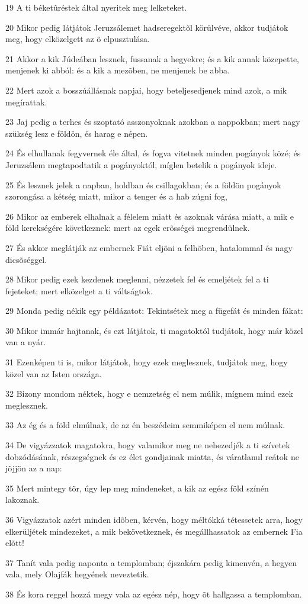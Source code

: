 \par 19 A ti béketûréstek által nyeritek meg lelketeket.
\par 20 Mikor pedig látjátok Jeruzsálemet hadseregektõl körülvéve, akkor tudjátok meg, hogy elközelgett az õ elpusztulása.
\par 21 Akkor a kik Júdeában lesznek, fussanak a hegyekre; és a kik annak közepette, menjenek ki abból: és a kik a mezõben, ne menjenek be abba.
\par 22 Mert azok a bosszúállásnak napjai, hogy beteljesedjenek mind azok, a mik megírattak.
\par 23 Jaj pedig a terhes és szoptató asszonyoknak azokban a nappokban; mert nagy szükség lesz e földön, és harag e népen.
\par 24 És elhullanak fegyvernek éle által, és fogva vitetnek minden pogányok közé; és Jeruzsálem megtapodtatik a pogányoktól, míglen betelik a pogányok ideje.
\par 25 És lesznek jelek a napban, holdban és csillagokban; és a földön pogányok szorongása a kétség miatt, mikor a tenger és a hab zúgni fog,
\par 26 Mikor az emberek elhalnak a félelem miatt és azoknak várása miatt, a mik e föld kerekségére következnek: mert az egek erõsségei megrendülnek.
\par 27 És akkor meglátják az embernek Fiát eljõni a felhõben, hatalommal és nagy dicsõséggel.
\par 28 Mikor pedig ezek kezdenek meglenni, nézzetek fel és emeljétek fel a ti fejeteket; mert elközelget a ti váltságtok.
\par 29 Monda pedig nékik egy példázatot: Tekintsétek meg a fügefát és minden fákat:
\par 30 Mikor immár hajtanak, és ezt látjátok, ti magatoktól tudjátok, hogy már közel van a nyár.
\par 31 Ezenképen ti is, mikor látjátok, hogy ezek meglesznek, tudjátok meg, hogy közel van az Isten országa.
\par 32 Bizony mondom néktek, hogy e nemzetség el nem múlik, mígnem mind ezek meglesznek.
\par 33 Az ég és a föld elmúlnak, de az  én beszédeim semmiképen el nem múlnak.
\par 34 De vigyázzatok magatokra, hogy valamikor meg ne nehezedjék a ti szívetek dobzódásának, részegségnek és ez élet gondjainak miatta, és váratlanul reátok ne jõjjön az a  nap:
\par 35 Mert mintegy tõr, úgy lep meg mindeneket, a kik az egész föld színén lakoznak.
\par 36 Vigyázzatok azért minden idõben, kérvén, hogy méltókká tétessetek arra, hogy elkerüljétek mindezeket, a mik bekövetkeznek, és megállhassatok az embernek Fia elõtt!
\par 37 Tanít vala pedig naponta a templomban; éjszakára pedig kimenvén, a hegyen vala, mely Olajfák hegyének neveztetik.
\par 38 És kora reggel hozzá megy vala az egész nép, hogy õt hallgassa a templomban.

